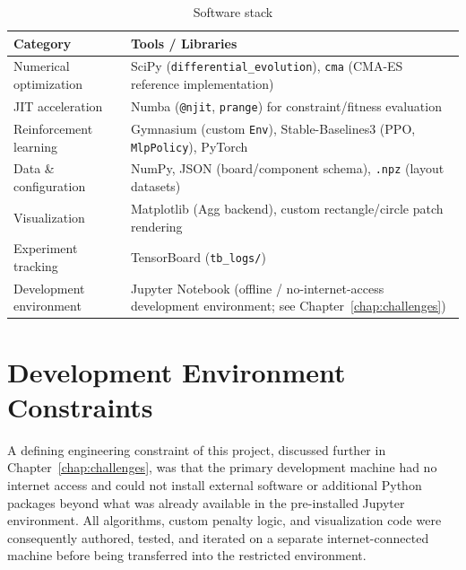 \documentclass[11pt,a4paper,oneside]{report}
\begin{document}
\begin{table}[H]
\centering
\caption{Software stack}
\label{tab:tools}
\begin{tabular}{|p{3.6cm}|p{9.6cm}|}
\hline
\textbf{Category} & \textbf{Tools / Libraries} \\
\hline
Numerical optimization & SciPy (\texttt{differential\_evolution}), \texttt{cma} (CMA-ES reference implementation) \\ \hline
JIT acceleration & Numba (\texttt{@njit}, \texttt{prange}) for constraint/fitness evaluation \\ \hline
Reinforcement learning & Gymnasium (custom \texttt{Env}), Stable-Baselines3 (PPO, \texttt{MlpPolicy}), PyTorch \\ \hline
Data \& configuration & NumPy, JSON (board/component schema), \texttt{.npz} (layout datasets) \\ \hline
Visualization & Matplotlib (Agg backend), custom rectangle/circle patch rendering \\ \hline
Experiment tracking & TensorBoard (\texttt{tb\_logs/}) \\ \hline
Development environment & Jupyter Notebook (offline / no-internet-access development environment; see Chapter~\ref{chap:challenges}) \\
\hline
\end{tabular}
\end{table}

\section{Development Environment Constraints}
A defining engineering constraint of this project, discussed further in Chapter~\ref{chap:challenges}, was that the primary development machine had no internet access and could not install external software or additional Python packages beyond what was already available in the pre-installed Jupyter environment. All algorithms, custom penalty logic, and visualization code were consequently authored, tested, and iterated on a separate internet-connected machine before being transferred into the restricted environment.
\end{document}
